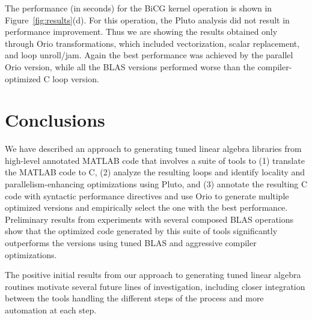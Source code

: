 \documentclass[runningheads]{llncs}
\begin{document}
The performance (in seconds) for the BiCG kernel operation is shown in
Figure~\ref{fig:results}(d). For this operation, the Pluto analysis did not
result in performance improvement. Thus we are showing the results obtained
only through Orio transformations, which included vectorization, scalar
replacement, and loop unroll/jam. Again the best performance was achieved
by the parallel Orio version, while all the BLAS versions performed worse
than the compiler-optimized C loop version.

\section{Conclusions}
\label{sec:conclusion}

We have described an approach to generating tuned linear algebra libraries
from high-level annotated MATLAB code that involves a suite of tools to (1)
translate the MATLAB code to C, (2) analyze the resulting loops and identify
locality and parallelism-enhancing optimizations using Pluto, and (3)
annotate the resulting C code with syntactic performance directives and use
Orio to generate multiple optimized versions and empirically select the one
with the best performance. Preliminary results from experiments with several
composed BLAS operations show that the optimized code generated by this suite
of tools significantly outperforms the versions using tuned BLAS and
aggressive compiler optimizations.

The positive initial results from our approach to generating tuned linear
algebra routines motivate several future lines of investigation, including closer
integration between the tools handling the different steps of the process and 
more automation at each step.

\end{document}

